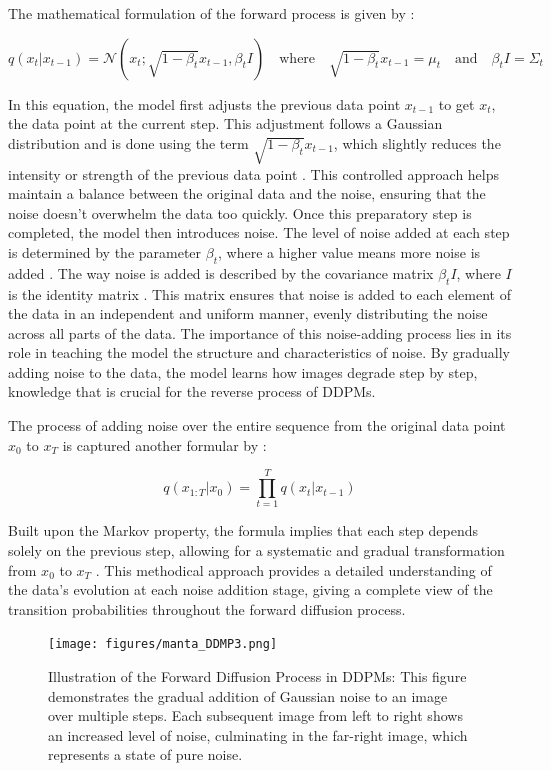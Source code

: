 The mathematical formulation of the forward process is given by \citeauthor{martinez2023understanding}:

\[
q(x_t | x_{t-1}) = \mathcal{N}(x_t; \sqrt{1 - \beta_t}x_{t-1}, \beta_t I) \quad \text{where} \quad \sqrt{1 - \beta_t}x_{t-1} = \mu_t \quad \text{and} \quad \beta_t I = \Sigma_t
\] 

In this equation, the model first adjusts the previous data point \( x_{t-1} \) to get \( x_t \), the data point at the current step. This adjustment follows a Gaussian distribution and is done using the term \( \sqrt{1 - \beta_t} x_{t-1} \), which slightly reduces the intensity or strength of the previous data point \citep{sohlDDPM, hoDDPMs}. This controlled approach helps maintain a balance between the original data and the noise, ensuring that the noise doesn't overwhelm the data too quickly. Once this preparatory step is completed, the model then introduces noise. The level of noise added at each step is determined by the parameter \( \beta_t \), where a higher value means more noise is added \citep{kingma2023variationalDM}. The way noise is added is described by the covariance matrix \( \beta_t I \), where \( I \) is the identity matrix \citep{croitoru2023diffusion}. This matrix ensures that noise is added to each element of the data in an independent and uniform manner, evenly distributing the noise across all parts of the data. The importance of this noise-adding process lies in its role in teaching the model the structure and characteristics of noise. By gradually adding noise to the data, the model learns how images degrade step by step, knowledge that is crucial for the reverse process of DDPMs.

The process of adding noise over the entire sequence from the original data point \( x_0 \) to \( x_T \) is captured another formular by \citeauthor{martinez2023understanding}:

\[q(x_{1:T} | x_0) = \prod_{t=1}^T q(x_t | x_{t-1}) \] 

Built upon the Markov property, the formula implies that each step depends solely on the previous step, allowing for a systematic and gradual transformation from \( x_0 \) to \( x_T \) \citep{martinez2023understanding}. This methodical approach provides a detailed understanding of the data's evolution at each noise addition stage, giving a complete view of the transition probabilities throughout the forward diffusion process.

\begin{figure}[ht]
\centering
  \texttt{[image: figures/manta\_DDMP3.png]}
  \caption{Illustration of the Forward Diffusion Process in DDPMs: This figure demonstrates the gradual addition of Gaussian noise to an image over multiple steps. Each subsequent image from left to right shows an increased level of noise, culminating in the far-right image, which represents a state of pure noise.}\label{fig:figureForwardProcess}
\end{figure}

